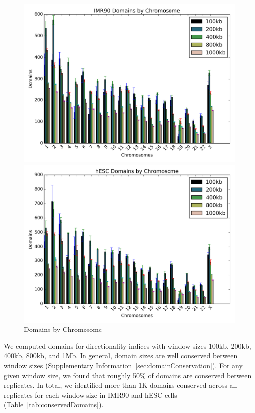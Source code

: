 \begin{figure}[H]
  \caption{Domains by Chromosome}
  \begin{minipage}{0.5\textwidth}%
    \includegraphics[width=\textwidth]{./figures/results/domain_imr90_bar.png}
  \end{minipage}%
  \hfill
  \begin{minipage}{0.5\textwidth}
    \includegraphics[width=\textwidth]{./figures/results/domain_hesc_bar.png}
  \end{minipage}
\end{figure}

We computed domains for directionality indices with window sizes 100kb, 200kb, 400kb, 800kb, and 1Mb.  In general, domain sizes are well conserved
between window sizes (Supplementary Information~\ref{sec:domainConservation}).  For any given window size, we found that roughly 50\% of domains
are conserved between replicates.  In total, we identified more than $1$K domains conserved across all replicates for each window size in IMR90 and
hESC cells (Table~\ref{tab:conservedDomains}).

